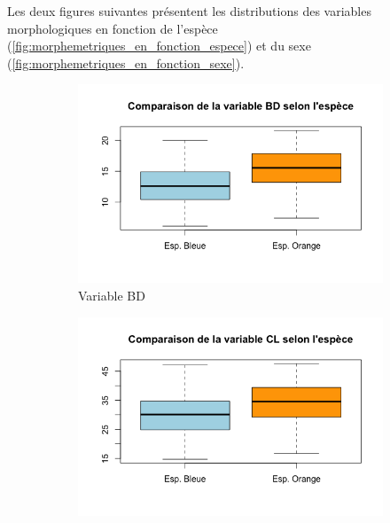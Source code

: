 \documentclass[a4paper,10pt]{report}
\begin{document}
Les deux figures suivantes présentent les distributions des variables morphologiques en fonction de l'espèce (\autoref{fig:morphemetriques_en_fonction_espece}) et du sexe (\autoref{fig:morphemetriques_en_fonction_sexe}).\\


\begin{figure}[H]
	\centering
	\captionsetup{justification=centering, margin=2cm}
	\begin{subfigure}[b]{0.3\linewidth}
		\centering
		\captionsetup{justification=centering, margin=1cm}
		\includegraphics[width=1\linewidth]{img/1-2-1-espece-bd.png}
		\caption{\scriptsize Variable BD}
		\label{fig:1_2_1_espece_bd}
	\end{subfigure}%
	\begin{subfigure}[b]{0.3\linewidth}
		\centering
		\captionsetup{justification=centering, margin=1cm}
		\includegraphics[width=1\linewidth]{img/1-2-1-espece-cl.png}

\end{subfigure}
\end{figure}
\end{document}
